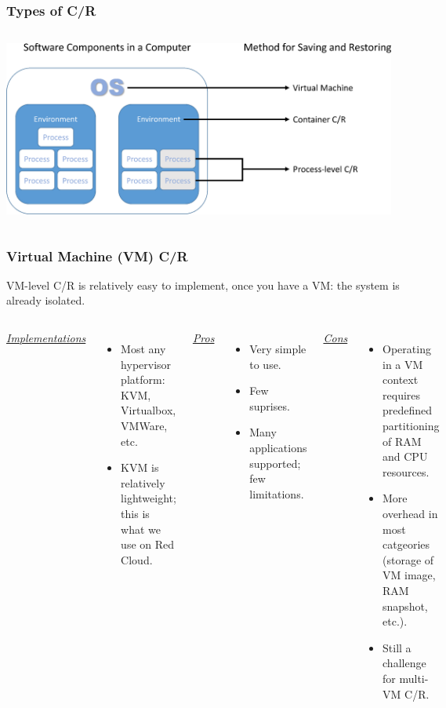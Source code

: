\documentclass[compress]{beamer}
\begin{document}

\begin{frame}
\frametitle{Types of C/R}
\begin{columns}[t]
 \includegraphics[width=13cm]{Types_of_CR}

\end{columns}
\end{frame}


\begin{frame}
\frametitle{Virtual Machine (VM) C/R}
VM-level C/R is relatively easy to implement, once you have a VM: the
system is already isolated.
\begin{columns}[t]
\ul{\textit{Implementations}}
\begin{itemize}
\item Most any hypervisor platform: KVM, Virtualbox, VMWare, etc.
\item KVM is relatively lightweight; this is what we use on Red Cloud.
\end{itemize}

\ul{\textit{Pros}}
\begin{itemize}
\item Very simple to use.
\item Few suprises.
\item Many applications supported; few limitations.
\end{itemize}

\ul{\textit{Cons}}
\begin{itemize}
\item Operating in a VM context requires predefined partitioning of RAM and CPU
resources.
\item More overhead in most catgeories (storage of VM image, RAM snapshot, etc.).
\item Still a challenge for multi-VM C/R.
\end{itemize}

\end{columns}
\end{frame}
  
\end{document}
